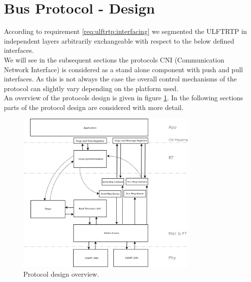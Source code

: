 \section{Bus Protocol - Design}
\label{sec:bus:design}

According to requirement \ref{req:ulftrtp:interfacing} we segmented the ULFTRTP in independent layers arbitrarily exchangeable with respect to the below defined interfaces.\\

We will see in the subsequent sections the protocols CNI (Communication Network Interface) is considered as a stand alone component with push and pull interfaces.
As this is not always the case the overall control mechanisms of the protocol can slightly vary depending on the platform used.\\

An overview of the protocols design is given in figure \ref{fig:bus:design:overview}. In the following sections parts of the protocol design are considered with more detail.

\begin{figure}[h]
\centering
\includegraphics[width=0.8\textwidth]{../images/protocol_design_overview.png}
\caption{Protocol design overview.}
\label{fig:bus:design:overview}
\end{figure}





